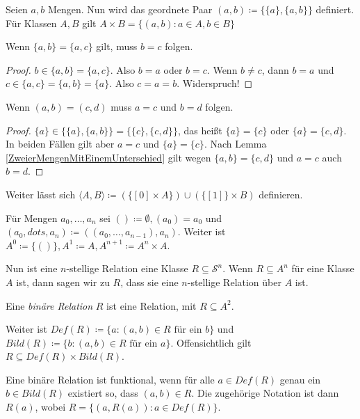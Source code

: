 \begin{definition}
	Seien $a, b$ Mengen. Nun wird das geordnete Paar $(a, b)\coloneqq\{\{a\}, \{a,b\}\}$ definiert. Für Klassen $A,B$ gilt $A\times B=\{(a,b):a\in A, b\in B\}$
\end{definition}

\begin{lemma}
	Wenn $\{a,b\}=\{a,c\}$ gilt, muss $b=c$ folgen.
	\label{ZweierMengenMitEinemUnterschied}
\end{lemma}
\begin{proof}
	$b\in \{a,b\}=\{a,c\}$. Also $b=a$ oder $b=c$. Wenn $b\neq c$, dann $b=a$ und $c\in\{a,c\}=\{a,b\}=\{a\}$. Also $c=a=b$. Widerspruch!
\end{proof}

\begin{lemma}
	Wenn $(a,b)=(c,d)$ muss $a=c$ und $b=d$ folgen.
\end{lemma}
\begin{proof}
	$\{a\}\in \{\{a\}, \{a,b\}\}=\{\{c\},\{c,d\}\}$, das heißt $\{a\}=\{c\}$ oder $\{a\}=\{c,d\}$. In beiden Fällen gilt aber $a=c$ und $\{a\}=\{c\}$. Nach Lemma \ref{ZweierMengenMitEinemUnterschied} gilt wegen $\{a,b\}=\{c,d\}$ und $a=c$ auch $b=d$.
\end{proof}

Weiter lässt sich $\langle A, B \rangle\coloneqq(\{[0]\times A\})\cup(\{[1]\}\times B)$ definieren.

Für Mengen $a_0,\dots,a_n$ sei $()\coloneqq \emptyset, (a_0)=a_0$ und $(a_0,dots,a_n)\coloneqq((a_0,\dots,a_{n-1}), a_n)$.
Weiter ist $A^0\coloneqq\{()\}, A^1\coloneqq A, A^{n+1}\coloneqq A^n\times A$.

Nun ist eine $n$-stellige Relation eine Klasse $R\subseteq \mathcal{S}^n$. Wenn $R\subseteq A^n$ für eine Klasse $A$ ist, dann sagen wir zu $R$, dass sie eine $n$-stellige Relation über $A$ ist.

\begin{definition}
	Eine \textit{binäre Relation} $R$ ist eine Relation, mit $R\subseteq A^2$.
\end{definition}

Weiter ist $Def(R)\coloneqq\{a : (a,b)\in R \text{ für ein } b\}$ und $Bild(R)\coloneqq \{b : (a,b)\in R \text{ für ein } a\}$. Offensichtlich gilt $R\subseteq Def(R)\times Bild(R)$.

Eine binäre Relation ist funktional, wenn für alle $a\in Def(R)$ genau ein $b\in Bild(R)$ existiert so, dass $(a,b)\in R$. Die zugehörige Notation ist dann $R(a)$, wobei $R=\{(a,R(a)) : a \in Def(R)\}$.

